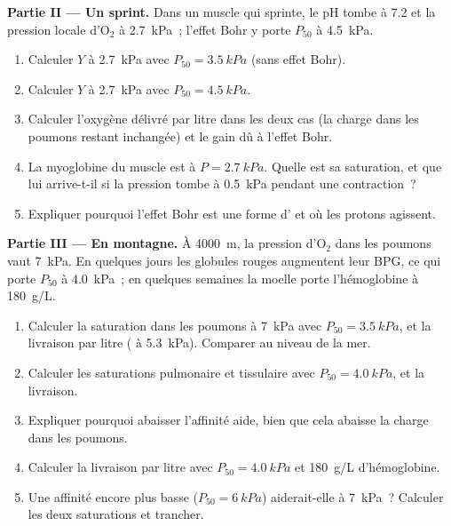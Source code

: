\begin{problem}
\medskip
\noindent\textbf{Partie II --- Un sprint.}
Dans un muscle qui sprinte, le pH tombe à 7.2 et la pression locale
d'$\mathrm{O_2}$ à \qty{2.7}{kPa}~; l'effet Bohr y porte $P_{50}$ à
\qty{4.5}{kPa}.
\begin{enumerate}[resume]
  \item Calculer $Y$ à \qty{2.7}{kPa} avec $P_{50} = \qty{3.5}{kPa}$
        (sans effet Bohr).
  \item Calculer $Y$ à \qty{2.7}{kPa} avec $P_{50} = \qty{4.5}{kPa}$.
  \item Calculer l'oxygène délivré par litre dans les deux cas (la
        charge dans les poumons restant inchangée) et le gain dû à
        l'effet Bohr.
  \item La myoglobine du muscle est à $P = \qty{2.7}{kPa}$. Quelle est
        sa saturation, et que lui arrive-t-il si la pression tombe à
        \qty{0.5}{kPa} pendant une contraction~?
  \item Expliquer pourquoi l'effet Bohr est une forme d' et où
        les protons agissent.
\end{enumerate}

\medskip
\noindent\textbf{Partie III --- En montagne.}
À \qty{4000}{m}, la pression d'$\mathrm{O_2}$ dans les poumons vaut
\qty{7}{kPa}. En quelques jours les globules rouges augmentent leur BPG,
ce qui porte $P_{50}$ à \qty{4.0}{kPa}~; en quelques semaines la moelle
porte l'hémoglobine à \qty{180}{g/L}.
\begin{enumerate}[resume]
  \item Calculer la saturation dans les poumons à \qty{7}{kPa} avec
        $P_{50} = \qty{3.5}{kPa}$, et la livraison par litre ( à
        \qty{5.3}{kPa}). Comparer au niveau de la mer.
  \item Calculer les saturations pulmonaire et tissulaire avec
        $P_{50} = \qty{4.0}{kPa}$, et la livraison.
  \item Expliquer pourquoi abaisser l'affinité aide, bien que cela
        abaisse la charge dans les poumons.
  \item Calculer la livraison par litre avec $P_{50} = \qty{4.0}{kPa}$
        et \qty{180}{g/L} d'hémoglobine.
  \item Une affinité encore plus basse ($P_{50} = \qty{6}{kPa}$)
        aiderait-elle à \qty{7}{kPa}~? Calculer les deux saturations et
        trancher.
\end{enumerate}


\end{problem}
